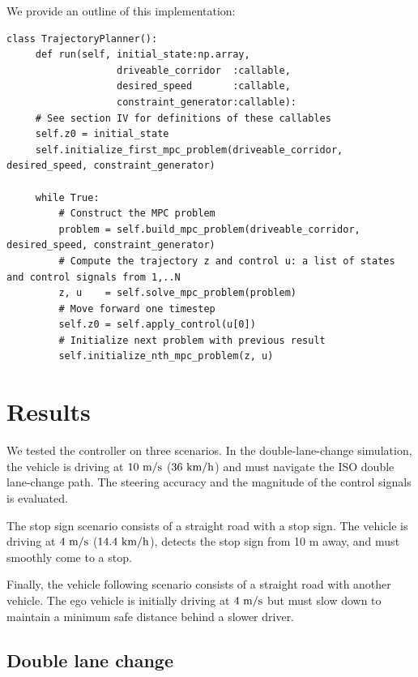 \documentclass[letterpaper, 10 pt, conference]{ieeeconf}  %
\begin{document}
 We provide an outline of this implementation:
 \begin{lstlisting}[caption={Nonlinear MPC controller using proposed API.},style=Python]
 class TrajectoryPlanner():
     def run(self, initial_state:np.array,
                   driveable_corridor  :callable,
                   desired_speed       :callable,
                   constraint_generator:callable):
     # See section IV for definitions of these callables
     self.z0 = initial_state
     self.initialize_first_mpc_problem(driveable_corridor, desired_speed, constraint_generator)
 
     while True:
         # Construct the MPC problem
         problem = self.build_mpc_problem(driveable_corridor, desired_speed, constraint_generator)
         # Compute the trajectory z and control u: a list of states and control signals from 1,..N
         z, u    = self.solve_mpc_problem(problem)
         # Move forward one timestep
         self.z0 = self.apply_control(u[0])
         # Initialize next problem with previous result
         self.initialize_nth_mpc_problem(z, u)
 \end{lstlisting}
 
 
 
 \section{Results} %
 We tested the controller on three scenarios. In the double-lane-change simulation, the vehicle is driving at $10\ \text{m}/\text{s}$ ($36\ \kmh$) and must navigate the ISO double lane-change path. The steering accuracy and the magnitude of the control signals is evaluated.
 
 The stop sign scenario consists of a straight road with a stop sign. The vehicle is driving at $4\ \text{m}/\text{s}$ ($14.4\ \text{km}/\text{h}$), detects the stop sign from 10 m away, and must smoothly come to a stop.
 
Finally, the vehicle following scenario consists of a straight road with another vehicle. The ego vehicle is initially driving at $4\ \text{m}/\text{s}$ but must slow down to maintain a minimum safe distance behind a slower driver.

 \subsection{Double lane change}
 
\end{document}
